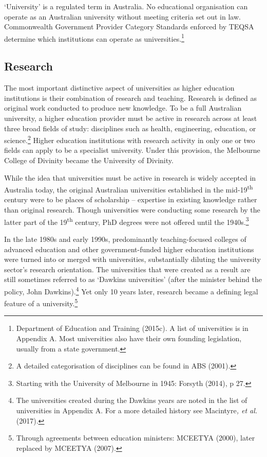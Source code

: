 \documentclass[]{book}
\begin{document}
`University' is a regulated term in Australia. No educational organisation can operate as an Australian university without meeting criteria set out in law. Commonwealth Government Provider Category Standards enforced by TEQSA determine which institutions can operate as universities.\footnote{Department of Education and Training (2015c). A list of universities is in Appendix A. Most universities also have their own founding legislation, usually from a state government.}

\hypertarget{research}{%
\subsection{Research}\label{research}}

The most important distinctive aspect of universities as higher education institutions is their combination of research and teaching. Research is defined as original work conducted to produce new knowledge. To be a full Australian university, a higher education provider must be active in research across at least three broad fields of study: disciplines such as health, engineering, education, or science.\footnote{A detailed categorisation of disciplines can be found in ABS (2001).} Higher education institutions with research activity in only one or two fields can apply to be a specialist university. Under this provision, the Melbourne College of Divinity became the University of Divinity.

While the idea that universities must be active in research is widely accepted in Australia today, the original Australian universities established in the mid-19\textsuperscript{th} century were to be places of scholarship -- expertise in existing knowledge rather than original research. Though universities were conducting some research by the latter part of the 19\textsuperscript{th} century, PhD degrees were not offered until the 1940s.\footnote{Starting with the University of Melbourne in 1945: Forsyth (2014), p 27.}

In the late 1980s and early 1990s, predominantly teaching-focused colleges of advanced education and other government-funded higher education institutions were turned into or merged with universities, substantially diluting the university sector's research orientation. The universities that were created as a result are still sometimes referred to as `Dawkins universities' (after the minister behind the policy, John Dawkins).\footnote{The universities created during the Dawkins years are noted in the list of universities in Appendix A. For a more detailed history see Macintyre\emph{, et al.} (2017).} Yet only 10 years later, research became a defining legal feature of a university.\footnote{Through agreements between education ministers: MCEETYA (2000), later replaced by MCEETYA (2007).}
\end{document}
